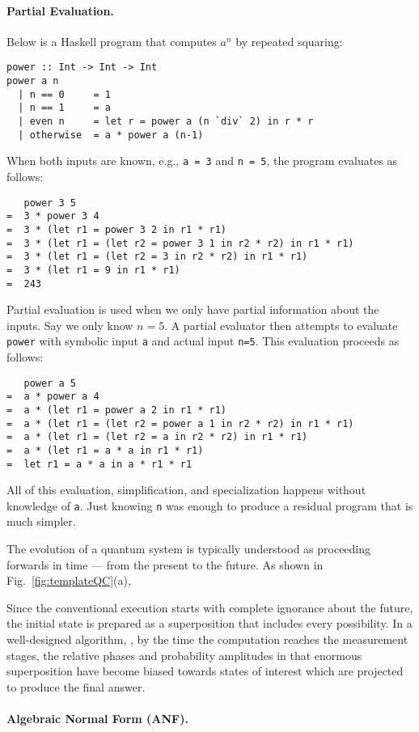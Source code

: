 \documentclass{article}
\begin{document}
\begin{refsection}
\paragraph*{Partial Evaluation.}
Below is a Haskell program that computes $a^n$ by repeated squaring:
\begin{verbatim}
power :: Int -> Int -> Int
power a n
  | n == 0     = 1
  | n == 1     = a
  | even n     = let r = power a (n `div` 2) in r * r 
  | otherwise  = a * power a (n-1)
\end{verbatim}
When both inputs are known, e.g., \verb|a = 3| and \verb|n = 5|, the
program evaluates as follows:
\begin{verbatim}
   power 3 5
=  3 * power 3 4
=  3 * (let r1 = power 3 2 in r1 * r1)
=  3 * (let r1 = (let r2 = power 3 1 in r2 * r2) in r1 * r1)
=  3 * (let r1 = (let r2 = 3 in r2 * r2) in r1 * r1)
=  3 * (let r1 = 9 in r1 * r1)
=  243
\end{verbatim}

Partial evaluation is used when we only have partial information about
the inputs. Say we only know $n=5$. A partial evaluator then attempts
to evaluate \verb|power| with symbolic input \verb|a| and actual input
\verb|n=5|. This evaluation proceeds as follows:
\begin{verbatim}
   power a 5 
=  a * power a 4 
=  a * (let r1 = power a 2 in r1 * r1)
=  a * (let r1 = (let r2 = power a 1 in r2 * r2) in r1 * r1)
=  a * (let r1 = (let r2 = a in r2 * r2) in r1 * r1)
=  a * (let r1 = a * a in r1 * r1)
=  let r1 = a * a in a * r1 * r1
\end{verbatim}
All of this evaluation, simplification, and specialization happens
without knowledge of \verb|a|. Just knowing \verb|n| was enough to
produce a residual program that is much simpler. 

The evolution of a quantum system is typically understood as
proceeding forwards in time --- from the present to the future. As
shown in Fig.~\ref{fig:templateQC}(a), 

Since the conventional execution starts with complete ignorance about
the future, the initial state is prepared as a superposition that
includes every possibility. In a well-designed algorithm, , by the
time the computation reaches the measurement stages, the relative
phases and probability amplitudes in that enormous superposition have
become biased towards states of interest which are projected to
produce the final answer.

\paragraph*{Algebraic Normal Form (ANF).}
\label{para:anf}


\end{refsection}
\end{document}
